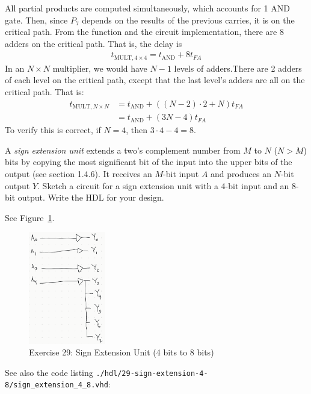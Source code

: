 \documentclass[12pt]{article}
\newenvironment{ex}[2][Exercise]{\begin{trivlist}
		\item[\hskip \labelsep {\bfseries #1}\hskip \labelsep {\bfseries #2.}]}{\end{trivlist}}
\newenvironment{sol}[1][Solution]{\begin{trivlist}
		\item[\hskip \labelsep {\bfseries #1:}]}{\end{trivlist}}
\begin{document}
\begin{sol}
	All partial products are computed simultaneously, which accounts for 1 AND gate.
	Then, since $P_7$ depends on the results of the previous carries, it is on the
	critical path. From the function and the circuit implementation, there are 8
	adders on the critical path. That is, the delay is
	\begin{align*}
		t_{\text{MULT}, 4\times 4}=t_{\text{AND}}+8t_{FA}
	\end{align*}
	In an $N\times N$ multiplier, we would have $N-1$ levels of adders.There are
	2 adders of each level on the critical path, except that the last level's
	adders are all on the critical path. That is:
	\begin{align*}
		t_{\text{MULT}, N\times N}&=t_{\text{AND}} + ((N-2)\cdot 2 + N)t_{FA}\\
		&=t_{\text{AND}}+(3N-4)t_{FA}
	\end{align*}
	To verify this is correct, if $N=4$, then $3\cdot 4 - 4=8$.
\end{sol}

\begin{ex}{5.29}
	A \emph{sign extension unit} extends a two's complement number from $M$ to $N$
	($N>M$) bits by copying the most significant bit of the input into the upper
	bits of the output (see section 1.4.6). It receives an $M$-bit input $A$ and produces
	an $N$-bit output $Y$. Sketch a circuit for a sign extension unit with a 4-bit input
	and an 8-bit output. Write the HDL for your design.
\end{ex}

\begin{sol}
	See Figure~\ref{05-29-sign-extension-unit-4-to-8-bits}.
	\begin{figure}
		\centering
		\includegraphics[width=0.3\textwidth]{05-29-sign-extension-unit-4-to-8-bits}
		\caption{Exercise 29: Sign Extension Unit (4 bits to 8 bits)}
		\label{05-29-sign-extension-unit-4-to-8-bits}
	\end{figure}
	See also the code listing \texttt{./hdl/29-sign-extension-4-8/sign\_extension\_4\_8.vhd}:
	
\end{sol}
\end{document}
